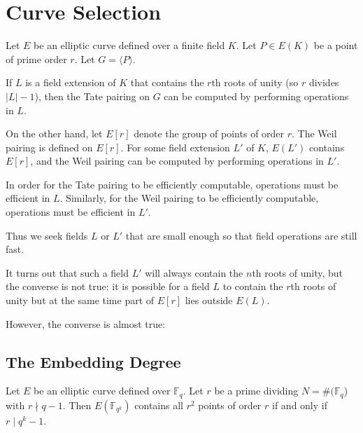 \chapter{Curve Selection}

Let $E$ be an elliptic curve defined over a finite field $K$.
Let $P \in E(K)$ be a point of prime order $r$. Let $G = \langle P \rangle$.

If $L$ is a field extension of $K$
that contains the $r$th roots of unity (so $r$ divides $|L| - 1$),
then the Tate pairing
on $G$ can be computed by performing operations in $L$.

On the other hand,
let $E[r]$ denote the group of points of order $r$.
The Weil pairing is defined on $E[r]$. For some field extension
$L'$ of $K$, $E(L')$ contains $E[r]$, and the Weil pairing can be
computed by performing operations in $L'$.

In order for the Tate pairing to be efficiently computable,
operations must be efficient in $L$.
Similarly, for the Weil pairing to be efficiently
computable, operations must be efficient in $L'$.

Thus we seek fields $L$ or $L'$ that are small enough so that field
operations are still fast.

It turns out that such a field $L'$ will always contain the $n$th
roots of unity, but the converse is not true: it is possible
for a field $L$ to contain the $r$th roots of unity but
at the same time part of $E[r]$ lies outside $E(L)$.

However, the converse is almost true:

\section {The Embedding Degree}

\begin{theorem} \cite{bk}
Let $E$ be an elliptic curve defined over $\mathbb{F}_q$.
Let $r$ be a prime dividing $N = \#(\mathbb{F}_q$) with
$r \nmid q-1$. Then $E(\mathbb{F}_{q^k})$ contains all $r^2$
points of order $r$ if and only if $r \mid q^k - 1$.
\end{theorem}

